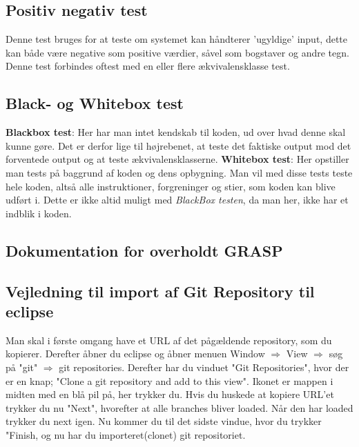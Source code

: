     \subsection{Positiv negativ test}
        Denne test bruges for at teste om systemet kan håndterer 'ugyldige' input, dette kan både være negative som positive værdier, såvel som bogstaver og andre tegn. Denne test forbindes oftest med en eller flere ækvivalensklasse test.
    \subsection{Black- og Whitebox test}

    \textbf{Blackbox test}: Her har man intet kendskab til koden, ud over hvad denne skal kunne gøre. Det er derfor lige til højrebenet, at teste det faktiske output mod det forventede output og at teste ækvivalensklasserne.
    \textbf{Whitebox test}: Her opstiller man tests på baggrund af koden og dens opbygning. Man vil med disse tests teste hele koden, altså alle instruktioner, forgreninger og stier, som koden kan blive udført i. Dette er ikke altid muligt med \textit{BlackBox testen}, da man her, ikke har et indblik i koden.
   
\subsection{Dokumentation for overholdt GRASP}

\subsection{Vejledning til import af Git Repository til eclipse}
Man skal i første omgang have et URL af det pågældende repository, som du kopierer.
Derefter åbner du eclipse og åbner menuen 
Window $\Rightarrow$ View $\Rightarrow$ søg på "git" $\Rightarrow$ git repositories.
Derefter har du vinduet "Git Repositories", hvor der er en knap; "Clone a git repository and add to this view".
Ikonet er mappen i midten med en blå pil på, her trykker du.
Hvis du huskede at kopiere URL'et trykker du nu "Next", hvorefter at alle branches bliver loaded. Når den har loaded trykker du next igen.
Nu kommer du til det sidste vindue, hvor du trykker "Finish, og nu har du importeret(clonet) git repositoriet.
